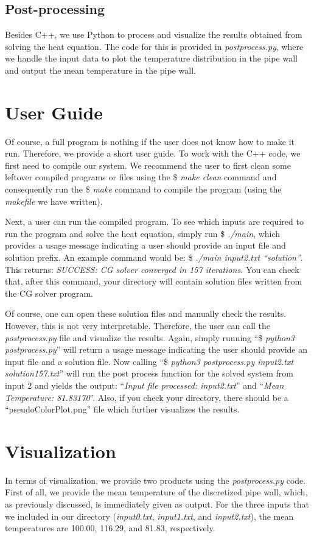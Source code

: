 \documentclass[12pt, a4paper]{article}
\begin{document}
\subsection{Post-processing}
Besides C++, we use Python to process and visualize the results obtained from 
solving the heat equation. The code for this is provided in 
\textit{postprocess.py}, where we handle the input data to plot the temperature 
distribution in the pipe wall and output the mean temperature in the pipe wall. 

\section{User Guide}
Of course, a full program is nothing if the user does not know how to make it 
run. Therefore, we provide a short user guide. To work with the C++ code, we 
first need to compile our system. We recommend the user to first clean some 
leftover compiled programs or files using the \$ \textit{make clean} command 
and consequently run the \$ \textit{make} command to compile the program 
(using the \textit{makefile} we have written).

Next, a user can run the compiled program. To see which inputs are required to
run the program and solve the heat equation, simply run \$ \textit{./main}, 
which provides a usage message indicating a user should provide an input 
file and solution prefix. An example command would be: 
\$ \textit{./main input2.txt ``solution''}. This returns: \textit{SUCCESS: CG 
solver converged in 157 iterations.} You can check that, after this command, 
your directory will contain solution files written from the CG solver program. 

Of course, one can open these solution files and manually check the results. 
However, this is not very interpretable. Therefore, the user can call the 
\textit{postprocess.py} file and visualize the results. Again, simply running
``\$ \textit{python3 postprocess.py}'' will return a usage message indicating 
the user should provide an input file and a solution file. Now calling ``\$ 
\textit{python3 postprocess.py input2.txt solution157.txt}'' will run the post 
process function for the solved system from input 2 and yields the output: 
``\textit{Input file processed: input2.txt}'' and 
``\textit{Mean Temperature: 81.83170}''. Also, if you check your directory, 
there should be a ``pseudoColorPlot.png'' file which further visualizes the
results.

\section{Visualization}
In terms of visualization, we provide two products using the 
\textit{postprocess.py} code. First of all, we provide the mean temperature 
of the discretized pipe wall, which, as previously discussed, is immediately
given as output. For the three inputs that we included in our directory 
(\textit{input0.txt}, \textit{input1.txt}, and \textit{input2.txt}), 
the mean temperatures are 100.00, 116.29, and 81.83, respectively. 
\end{document}
